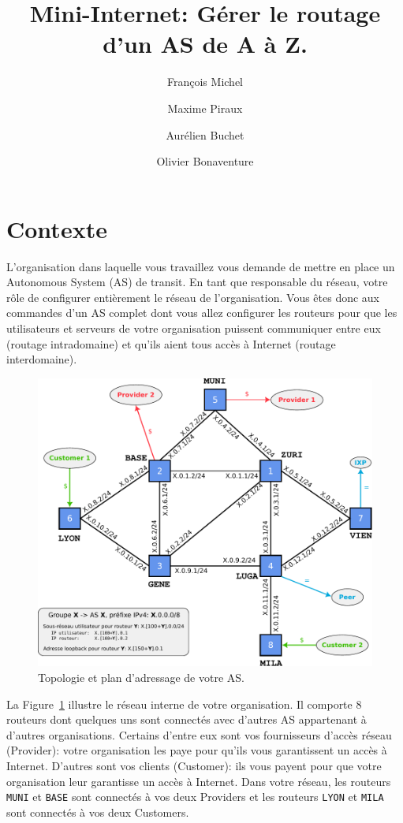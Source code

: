 \documentclass[a4paper, 11pt]{article}
\title{Mini-Internet: Gérer le routage d'un AS de A à Z.}
\author{François Michel \and Maxime Piraux \and Aurélien Buchet \and Olivier Bonaventure}
\begin{document}
\maketitle
\tableofcontents

\section{Contexte}

L'organisation dans laquelle vous travaillez vous demande
de mettre en place un Autonomous System (AS) de transit.
En tant que responsable du réseau, votre rôle
de configurer entièrement le réseau de l'organisation.
Vous êtes donc aux commandes d'un AS complet
dont vous allez configurer les routeurs pour que les utilisateurs
et serveurs de votre organisation puissent communiquer entre eux
(routage intradomaine) et qu'ils aient tous accès à Internet
(routage interdomaine).

\begin{figure}
    \includegraphics[width=\linewidth]{figures/topo}
    \caption{Topologie et plan d'adressage de votre AS.}
    \label{fig:topo}
\end{figure}

La Figure~\ref{fig:topo} illustre le réseau interne de votre organisation.
Il comporte 8 routeurs dont quelques uns sont connectés avec d'autres AS
appartenant à d'autres organisations. Certains d'entre eux sont
vos fournisseurs d'accès réseau (Provider): votre organisation
les paye pour qu'ils vous garantissent un accès à Internet.
D'autres sont vos clients (Customer): ils vous payent pour que
votre organisation leur garantisse un accès à Internet.   
Dans votre réseau, les routeurs \texttt{MUNI} et \texttt{BASE}
sont connectés à vos deux Providers et les routeurs \texttt{LYON}
et \texttt{MILA} sont connectés à vos deux Customers.
\end{document}
